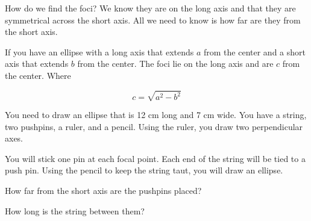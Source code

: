 How do we find the foci? We know they are on the long axis and that
they are symmetrical across the short axis. All we need to know is how
far are they from the short axis.

\begin{mdframed}[style=important, frametitle={Distance from Center to the Foci}]

If you have an ellipse with a long axis that extends $a$ from the center
and a short axis that extends $b$ from the center.  The foci
lie on the long axis and are $c$ from the center.  Where

$$c = \sqrt{a^2 - b^2}$$

\end{mdframed}

\begin{Exercise}[title={Foci of an ellipse}, label=ellipse_foci]
  
You need to draw an ellipse that is 12 cm long and 7 cm wide.  You
have a string, two pushpins, a ruler, and a pencil. Using the ruler,
you draw two perpendicular axes.

You will stick one pin at each focal point.  Each end of the string
will be tied to a push pin. Using the pencil to keep the string taut, you will draw
an ellipse.


How far from the short axis are the pushpins placed?

How long is the string between them?

\end{Exercise}
